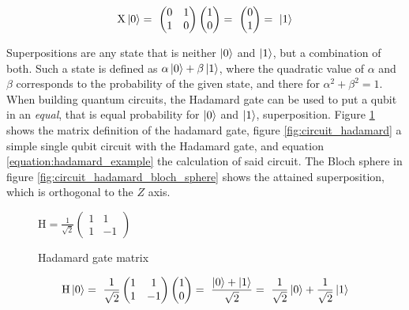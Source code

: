 \begin{equation}
    \centering
    \begin{split}
        \mathrm{X}\ket{0} =\ \begin{pmatrix} 0 & 1 \\ 1 & 0 \end{pmatrix}\begin{pmatrix}1 \\ 0\end{pmatrix} =\ \begin{pmatrix}0 \\ 1\end{pmatrix} =\ \ket{1}
    \end{split}
    \label{equation:pauli_x_example}
\end{equation}

Superpositions are any state that is neither $\ket{0}$ and $\ket{1}$, but a combination of both. Such a state is defined as $\alpha\ket{0} + \beta\ket{1}$, where the quadratic value of $\alpha$ and $\beta$ corresponds to the probability of the given state, and there for $\alpha^2 + \beta^2 = 1$. When building quantum circuits, the Hadamard\cite{qiskit_hgate_nodate} gate can be used to put a qubit in an \emph{equal}, that is equal probability for $\ket{0}$ and $\ket{1}$, superposition. Figure \ref{fig:matrix_hadamard} shows the matrix definition of the hadamard gate, figure \ref{fig:circuit_hadamard} a simple single qubit circuit with the Hadamard gate, and equation \ref{equation:hadamard_example} the calculation of said circuit. The Bloch sphere in figure \ref{fig:circuit_hadamard_bloch_sphere} shows the attained superposition, which is orthogonal to the $Z$ axis.

\begin{figure}[!h]
    \centering
    $\mathrm{H} = \frac{1}{\sqrt{2}}\begin{pmatrix}1 & 1 \\1 & -1\end{pmatrix}$
    \caption{Hadamard gate matrix}
    \label{fig:matrix_hadamard}
\end{figure}

\begin{equation}
    \centering
    \begin{split}
        \mathrm{H}\ket{0} =\ \frac{1}{\sqrt{2}}\begin{pmatrix}1 & 1 \\1 & -1\end{pmatrix}\begin{pmatrix}1 \\ 0\end{pmatrix} =\ \frac{\ket{0} + \ket{1}}{\sqrt{2}} =\ \frac{1}{\sqrt{2}}\ket{0} + \frac{1}{\sqrt{2}}\ket{1}
    \end{split}
    \label{equation:hadamard_example}
\end{equation}


